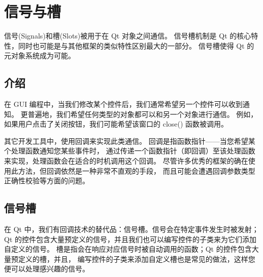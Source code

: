 \chapter{信号与槽}

信号(Signals)和槽(Slots)被用于在 Qt 对象之间通信。
信号槽机制是 Qt 的核心特性，同时也可能是与其他框架的类似特性区别最大的一部分。
信号槽使得 Qt 的元对象系统成为可能。

\section{介绍}

在 GUI 编程中，当我们修改某个控件后，我们通常希望另一个控件可以收到通知。
更普遍地，我们希望任何类型的对象都可以和另一个对象进行通信。
例如，如果用户点击了关闭按钮，我们可能希望该窗口的 close() 函数被调用。

其它开发工具中，使用回调来实现此类通信。
回调是指函数指针——当您希望某个处理函数通知您某些事件时，
通过传递一个函数指针（即回调）至该处理函数来实现，处理函数会在适合的时机调用这个回调。
尽管许多优秀的框架的确在使用此方法，但回调依然是一种非常不直观的手段，
而且可能会遭遇回调参数类型正确性校验等方面的问题。

\section{信号槽}

在 Qt 中，我们有回调技术的替代品：信号槽。信号会在特定事件发生时被发射；
Qt 的控件包含大量预定义的信号，并且我们也可以编写控件的子类来为它们添加自定义的信号。
槽是指会在响应对应信号时被自动调用的函数；Qt 的控件包含大量预定义的槽，并且，
编写控件的子类来添加自定义槽也是常见的做法，这样您便可以处理感兴趣的信号。